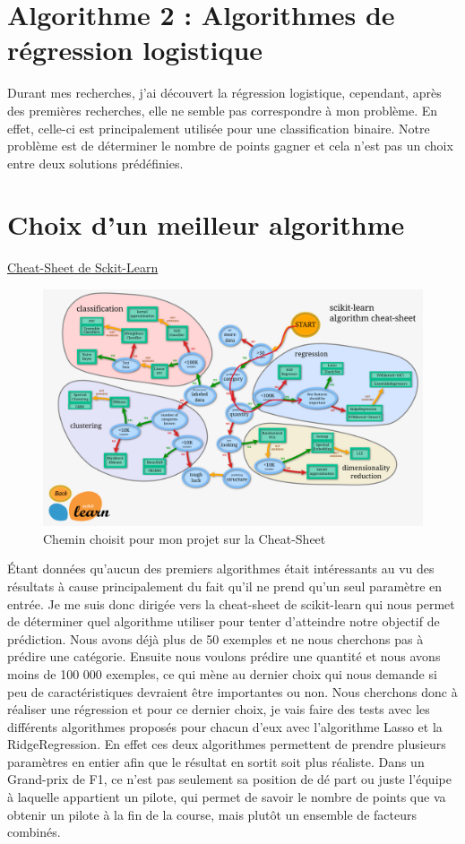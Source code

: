 \section{Algorithme 2 : Algorithmes de régression logistique}
Durant mes recherches, j'ai découvert la régression logistique, cependant, après des premières recherches, elle ne semble pas correspondre à mon problème. En effet, celle-ci est principalement utilisée pour une classification binaire. Notre problème est de déterminer le nombre de points gagner et cela n'est pas un choix entre deux solutions prédéfinies.

\newpage
\section{Choix d'un meilleur algorithme}

\href{https://scikit-learn.org/stable/tutorial/machine_learning_map/index.html}{Cheat-Sheet de Sckit-Learn}\\

\begin{figure}[H]
    \centering
    \includegraphics[width=1\textwidth]{images/cheat-sheet.png} 
    \caption{Chemin choisit pour mon projet sur la Cheat-Sheet}
\end{figure}
Étant données qu'aucun des premiers algorithmes était intéressants au vu des résultats à cause principalement du fait qu'il ne prend qu'un seul paramètre en entrée. Je me suis donc dirigée vers la cheat-sheet de scikit-learn qui nous permet de déterminer quel algorithme utiliser pour tenter d'atteindre notre objectif de prédiction. Nous avons déjà plus de 50 exemples et ne nous cherchons pas à prédire une catégorie. Ensuite nous voulons prédire une quantité et nous avons moins de 100 000 exemples, ce qui mène au dernier choix qui nous demande si peu de caractéristiques devraient être importantes ou non. Nous cherchons donc à réaliser une régression et pour ce dernier choix, je vais faire des tests avec les différents algorithmes proposés pour chacun d'eux avec l'algorithme Lasso et la RidgeRegression. En effet ces deux algorithmes permettent de prendre plusieurs paramètres en entier afin que le résultat en sortit soit plus réaliste. Dans un Grand-prix de F1, ce n'est pas seulement sa position de dé part ou juste l'équipe à laquelle appartient un pilote, qui permet de savoir le nombre de points que va obtenir un pilote à la fin de la course, mais plutôt un ensemble de facteurs combinés. 

